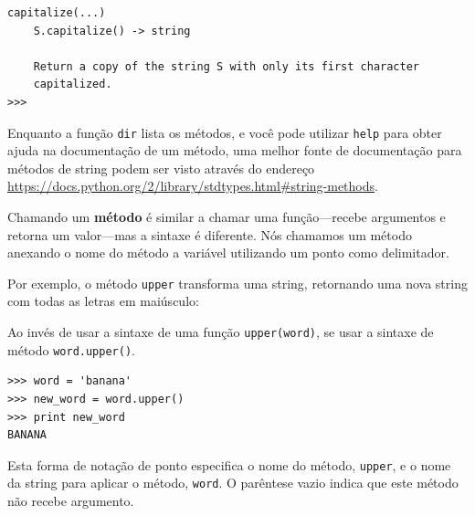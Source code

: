 {\begin{verbatim}
capitalize(...)
    S.capitalize() -> string

    Return a copy of the string S with only its first character
    capitalized.
>>>
\end{verbatim}
\afterverb
%


Enquanto a função {\tt dir} lista os métodos, e você pode utilizar {\tt help}
para obter ajuda na documentação de um método, uma melhor fonte de
documentação para métodos de string podem ser visto através do endereço
\url{https://docs.python.org/2/library/stdtypes.html#string-methods}.


Chamando um {\bf método} é similar a chamar uma função---recebe argumentos e
retorna um valor---mas a sintaxe é diferente. Nós chamamos um método anexando
o nome do método a variável utilizando um ponto como delimitador.


Por exemplo, o método {\tt upper} transforma uma string, retornando uma nova
string com todas as letras em maiúsculo:


Ao invés de usar a sintaxe de uma função {\tt upper(word)}, se usar a sintaxe
de método {\tt word.upper()}.


\beforeverb
\begin{verbatim}
>>> word = 'banana'
>>> new_word = word.upper()
>>> print new_word
BANANA
\end{verbatim}
\afterverb
%
%
Esta forma de notação de ponto especifica o nome do método, {\tt upper}, e
o nome da string para aplicar o método, {\tt word}. O parêntese vazio indica
que este método não recebe argumento.

}
